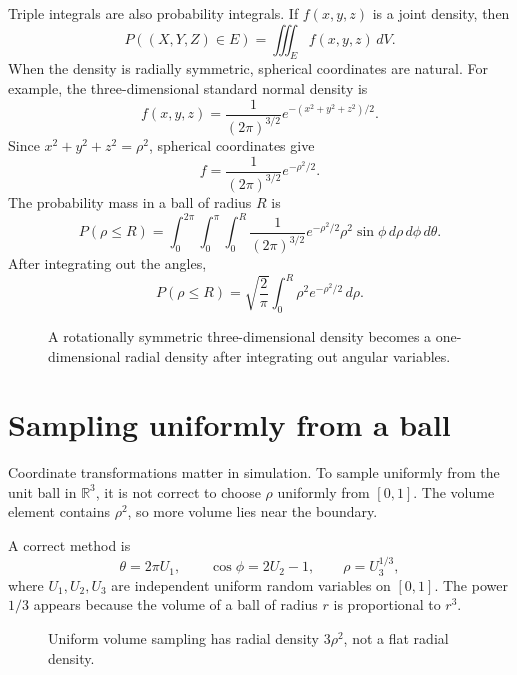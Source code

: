 \documentclass[11pt,oneside]{book}
\newcommand{\R}{\mathbb{R}}
\begin{document}
Triple integrals are also probability integrals. If $f(x,y,z)$ is a joint density, then
\[
P((X,Y,Z)\in E)=\iiint_E f(x,y,z)\,dV.
\]
When the density is radially symmetric, spherical coordinates are natural. For example, the three-dimensional standard normal density is
\[
f(x,y,z)=\frac{1}{(2\pi)^{3/2}}e^{-(x^2+y^2+z^2)/2}.
\]
Since $x^2+y^2+z^2=\rho^2$, spherical coordinates give
\[
f=\frac{1}{(2\pi)^{3/2}}e^{-\rho^2/2}.
\]
The probability mass in a ball of radius $R$ is
\[
P(\rho\le R)=\int_0^{2\pi}\int_0^\pi\int_0^R
\frac{1}{(2\pi)^{3/2}}e^{-\rho^2/2}\rho^2\sin\phi\,d\rho\,d\phi\,d\theta.
\]
After integrating out the angles,
\[
P(\rho\le R)=\sqrt{\frac{2}{\pi}}\int_0^R \rho^2e^{-\rho^2/2}\,d\rho.
\]

\begin{figure}[H]
\centering
{}
\caption{A rotationally symmetric three-dimensional density becomes a one-dimensional radial density after integrating out angular variables.}
\end{figure}

\section{Sampling uniformly from a ball}

Coordinate transformations matter in simulation. To sample uniformly from the unit ball in $\R^3$, it is not correct to choose $\rho$ uniformly from $[0,1]$. The volume element contains $\rho^2$, so more volume lies near the boundary.

A correct method is
\[
\theta=2\pi U_1,\qquad \cos\phi=2U_2-1,\qquad \rho=U_3^{1/3},
\]
where $U_1,U_2,U_3$ are independent uniform random variables on $[0,1]$. The power $1/3$ appears because the volume of a ball of radius $r$ is proportional to $r^3$.

\begin{figure}[H]
\centering
{}
\caption{Uniform volume sampling has radial density $3\rho^2$, not a flat radial density.}
\end{figure}
\end{document}
